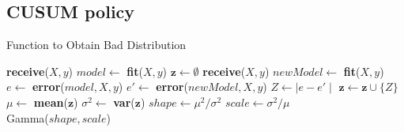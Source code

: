 \documentclass{mpaper}
\begin{document}



\begin{appendix}
\section{CUSUM policy}\label{baddist}
\begin{algorithm}[H]
\caption{Function to Obtain Bad Distribution}
\begin{algorithmic}
    \State \textbf{receive}($X, y$)
    \State $model \gets$ \textbf{fit}($X,y$)
    \State $\textbf{z} \gets \emptyset$
        \State \textbf{receive}($X, y$)
        \State $newModel \gets$ \textbf{fit}($X,y$)
        \State $e \gets$ \textbf{error}($model,X,y$)
        \State $e' \gets$ \textbf{error}($newModel,X,y$)
        \State $Z \gets \mid e - e' \mid$
        \State $\textbf{z} \gets \textbf{z} \cup \{Z\}$
    \EndFor
    \State $\mu \gets$ \textbf{mean}($\textbf{z}$)
    \State $\sigma^2 \gets$ \textbf{var}($\textbf{z}$)
    \State $shape \gets \mu^2/\sigma^2$
    \State $scale \gets \sigma^2/\mu$\\
    \Return Gamma($shape, scale$)
\EndFunction
\end{algorithmic}
\end{algorithm}


\end{appendix}
\end{document}
